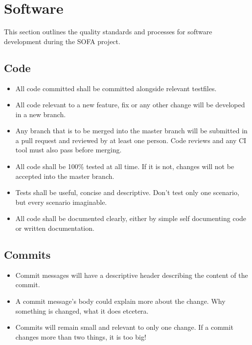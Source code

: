 \section{Software}
This section outlines the quality standards and processes for software development during the SOFA project.

\subsection{Code}
\begin{itemize}
	\item All code committed shall be committed alongside relevant testfiles.
	\item All code relevant to a new feature, fix or any other change will be developed in a new branch.
	\item Any branch that is to be merged into the master branch will be submitted in a pull request and reviewed by at least one person.
	Code reviews and any CI tool must also pass before merging.
	\item All code shall be 100\% tested at all time. If it is not, changes will not be accepted into the master branch.
	\item Tests shall be useful, concise and descriptive. Don't test only one scenario, but every scenario imaginable.
	\item All code shall be documented clearly, either by simple self documenting code or written documentation.
	
\end{itemize}

\subsection{Commits}

\begin{itemize}
	\item Commit messages will have a descriptive header describing the content of the commit.
	\item A commit message's body could explain more about the change. Why something is changed, what it does etcetera.
	\item Commits will remain small and relevant to only one change. If a commit changes more than two things, it is too big!
\end{itemize}

	
	
	
	
	